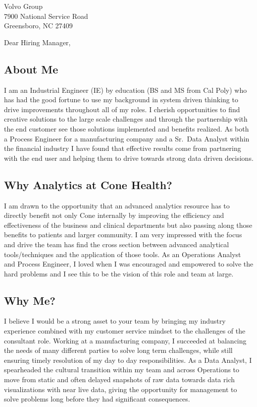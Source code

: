 \documentclass[version=last,12pt,{"C:/Program Files/R/R-3.6.1/library/komaletter/rmarkdown/templates/pdf/resources/maintainersDelight"},]{scrlttr2}
\begin{document}
\begin{letter}{Volvo Group\\7900 National Service Road\\Greensboro, NC 27409}
\opening{Dear Hiring Manager,}

\hypertarget{about-me}{%
\subsection{About Me}\label{about-me}}

I am an Industrial Engineer (IE) by education (BS and MS from Cal Poly)
who has had the good fortune to use my background in system driven
thinking to drive improvements throughout all of my roles. I cherish
opportunities to find creative solutions to the large scale challenges
and through the partnership with the end customer see those solutions
implemented and benefits realized. As both a Process Engineer for a
manufacturing company and a Sr.~Data Analyst within the financial
industry I have found that effective results come from partnering with
the end user and helping them to drive towards strong data driven
decisions.

\hypertarget{why-analytics-at-cone-health}{%
\subsection{Why Analytics at Cone
Health?}\label{why-analytics-at-cone-health}}

I am drawn to the opportunity that an advanced analytics resource has to
directly benefit not only Cone internally by improving the efficiency
and effectiveness of the business and clinical departments but also
passing along those benefits to patients and larger community. I am very
impressed with the focus and drive the team has find the cross section
between advanced analytical tools/techniques and the application of
those tools. As an Operations Analyst and Process Engineer, I loved when
I was encouraged and empowered to solve the hard problems and I see this
to be the vision of this role and team at large.

\hypertarget{why-me}{%
\subsection{Why Me?}\label{why-me}}

I believe I would be a strong asset to your team by bringing my industry
experience combined with my customer service mindset to the challenges
of the consultant role. Working at a manufacturing company, I succeeded
at balancing the needs of many different parties to solve long term
challenges, while still ensuring timely resolution of my day to day
responsibilities. As a Data Analyst, I spearheaded the cultural
transition within my team and across Operations to move from static and
often delayed snapshots of raw data towards data rich visualizations
with near live data, giving the opportunity for management to solve
problems long before they had significant consequences.


\end{letter}
\end{document}

